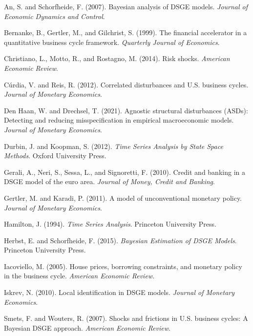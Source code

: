 \documentclass[11pt]{article}
\begin{document}

\begin{thebibliography}{}

An, S. and Schorfheide, F. (2007).
Bayesian analysis of DSGE models.
\textit{Journal of Economic Dynamics and Control}.

Bernanke, B., Gertler, M., and Gilchrist, S. (1999).
The financial accelerator in a quantitative business cycle framework.
\textit{Quarterly Journal of Economics}.

Christiano, L., Motto, R., and Rostagno, M. (2014).
Risk shocks.
\textit{American Economic Review}.

Cúrdia, V. and Reis, R. (2012).
Correlated disturbances and {U.S.} business cycles.
\textit{Journal of Monetary Economics}.

Den Haan, W. and Drechsel, T. (2021).
Agnostic structural disturbances (ASDs): Detecting and reducing misspecification in empirical macroeconomic models.
\textit{Journal of Monetary Economics}.

Durbin, J. and Koopman, S. (2012).
\textit{Time Series Analysis by State Space Methods}.
Oxford University Press.

Gerali, A., Neri, S., Sessa, L., and Signoretti, F. (2010).
Credit and banking in a DSGE model of the euro area.
\textit{Journal of Money, Credit and Banking}.

Gertler, M. and Karadi, P. (2011).
A model of unconventional monetary policy.
\textit{Journal of Monetary Economics}.

Hamilton, J. (1994).
\textit{Time Series Analysis}.
Princeton University Press.

Herbst, E. and Schorfheide, F. (2015).
\textit{Bayesian Estimation of DSGE Models}.
Princeton University Press.

Iacoviello, M. (2005).
House prices, borrowing constraints, and monetary policy in the business cycle.
\textit{American Economic Review}.

Iskrev, N. (2010).
Local identification in DSGE models.
\textit{Journal of Monetary Economics}.

Smets, F. and Wouters, R. (2007).
Shocks and frictions in U.S. business cycles: A Bayesian DSGE approach.
\textit{American Economic Review}.

\end{thebibliography}
\end{document}
